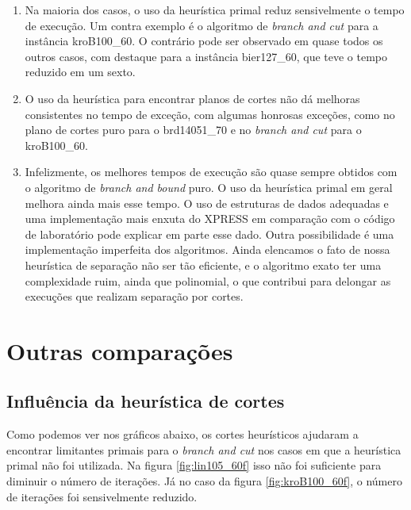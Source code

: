 \documentclass[11pt]{article}
\begin{document}
\begin{enumerate}
 \item Na maioria dos casos, o uso da heurística primal reduz
       sensivelmente o tempo de execução. Um contra exemplo é o
       algoritmo de \emph{branch and cut} para a instância
       kroB100\_60. O contrário pode ser observado em quase todos os
       outros casos, com destaque para a instância bier127\_60, que teve
       o tempo reduzido em um sexto. 
 \item O uso da heurística para encontrar planos de cortes não dá
       melhoras consistentes no tempo de exceção, com algumas honrosas
       exceções, como no plano de cortes puro para o brd14051\_70 e no
       \emph{branch and cut} para o kroB100\_60.
 \item Infelizmente, os melhores tempos de execução são quase sempre
       obtidos com o algoritmo de \emph{branch and bound} puro. O uso da
       heurística primal em geral melhora ainda mais esse tempo. O uso
       de estruturas de dados adequadas e uma implementação mais enxuta
       do XPRESS em comparação com o código de laboratório pode explicar
       em parte esse dado. Outra possibilidade é uma implementação
       imperfeita dos algoritmos. Ainda elencamos o fato de nossa
       heurística de separação não ser tão eficiente, e o algoritmo
       exato ter uma complexidade ruim, ainda que polinomial, o que
       contribui para delongar as execuções que realizam separação por
       cortes. 
\end{enumerate} 

\section{Outras comparações}

\subsection{Influência da heurística de cortes}

Como podemos ver nos gráficos abaixo, os cortes heurísticos ajudaram a
encontrar limitantes primais para o \emph{branch and cut} nos casos em
que a heurística primal não foi utilizada. Na figura
\ref{fig:lin105_60f} isso não foi suficiente para diminuir o número de
iterações. Já no caso da figura \ref{fig:kroB100_60f}, o número de
iterações foi sensivelmente reduzido.
\end{document}
